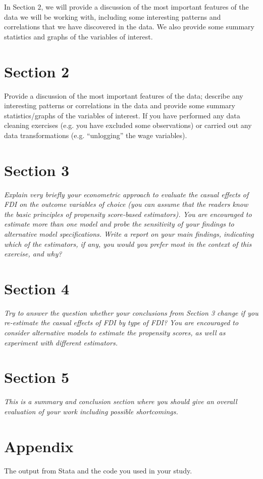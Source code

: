 \documentclass[11pt,a4paper,leqno]{article}
\begin{document}
In Section $2$, we will provide a discussion of the most important features of the data we will be working with, including some interesting patterns and correlations that we have discovered in the data. We also provide some summary statistics and graphs of the variables of interest.

\section*{Section 2}
Provide a discussion of the most important features of the data; describe any interesting
patterns or correlations in the data and provide some summary statistics/graphs of the
variables of interest. If you have performed any data cleaning exercises (e.g. you have
excluded some observations) or carried out any data transformations (e.g. “unlogging” the
wage variables).


\section*{Section 3}
\textit{Explain very briefly your econometric approach to evaluate the casual effects of FDI on the outcome variables of choice (you can assume that the readers know the basic principles of propensity score-based estimators). You are encouraged to estimate more than one model and probe the sensitivity of your findings to alternative model specifications. Write a report on your main findings, indicating which of the estimators, if any, you would you prefer most in the context of this exercise, and why?}

\section*{Section 4}
\textit{Try to answer the question whether your conclusions from Section 3 change if you re-estimate the casual effects of FDI by type of FDI? You are encouraged to consider alternative models to estimate the propensity scores, as well as experiment with different estimators.}

\section*{Section 5} 
\textit{This is a summary and conclusion section where you should give an overall evaluation of your work including possible shortcomings.}

\nocite{chen2011}
\clearpage



\appendix
\section*{Appendix}
The output from Stata and the code you used in your study.
\end{document}
